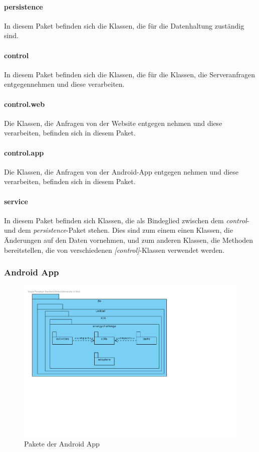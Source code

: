 \paragraph{persistence} In diesem Paket befinden sich die Klassen, die für die Datenhaltung zuständig sind.
\paragraph{control} In diesem Paket befinden sich die Klassen, die für die Klassen, die Serveranfragen entgegennehmen und diese verarbeiten.
\paragraph{control.web} Die Klassen, die Anfragen von der Website entgegen nehmen und diese verarbeiten, befinden sich in diesem Paket.
\paragraph{control.app} Die Klassen, die Anfragen von der Android-App entgegen nehmen und diese verarbeiten, befinden sich in diesem Paket.
\paragraph{service} In diesem Paket befinden sich Klassen, die als Bindeglied zwischen dem \emph{control}- und dem \emph{persistence}-Paket stehen. Dies sind zum einem einen Klassen, die Änderungen auf den Daten vornehmen, und zum anderen Klassen, die Methoden bereitstellen, die von verschiedenen \emph{[control]}-Klassen verwendet werden.

\subsubsection{Android App}

\begin{figure}[H]
  \centering
  \includegraphics[width=\textwidth, trim=1cm 7cm 9cm 1cm, clip]{gfx/app_package_diagram}
  \caption{Pakete der Android App}
\end{figure}

